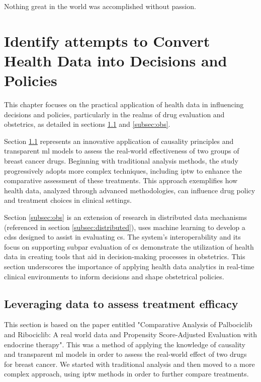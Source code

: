 \begin{savequote}[85mm]
    Nothing great in the world was accomplished 
    without passion.
    \end{savequote}
    
\chapter{Identify attempts to Convert Health Data into Decisions and Policies}\label{chap:goal3}
This chapter focuses on the practical application of health data in influencing decisions and policies, particularly in the realms of drug evaluation and obstetrics, as detailed in sections \ref{subsec:ipop} and \ref{subsec:obs}.

Section \ref{subsec:ipop} represents an innovative application of causality principles and transparent \ac{ml} models to assess the real-world effectiveness of two groups of breast cancer drugs. Beginning with traditional analysis methods, the study progressively adopts more complex techniques, including \ac{iptw} to enhance the comparative assessment of these treatments. This approach exemplifies how health data, analyzed through advanced methodologies, can influence drug policy and treatment choices in clinical settings.

Section \ref{subsec:obs} is an extension of research in distributed data mechanisms (referenced in section \ref{subsec:distributed}), uses machine learning to develop a \ac{cdss} designed to assist in evaluating \ac{cs}. The system's interoperability and its focus on supporting subpar evaluation of \ac{cs} demonstrate the utilization of health data in creating tools that aid in decision-making processes in obstetrics. This section underscores the importance of applying health data analytics in real-time clinical environments to inform decisions and shape obstetrical policies.



\section{Leveraging data to assess treatment efficacy}\label{subsec:ipop}
This section is based on the paper entitled "Comparative Analysis of Palbociclib and Ribociclib: A real world data and Propensity Score-Adjusted Evaluation with endocrine therapy". This was a method of applying the knowledge of causality and transparent \ac{ml} models in order to assess the real-world effect of two drugs for breast cancer. We started with traditional analysis and then moved to a more complex approach, using \ac{iptw} methods in order to further compare treatments.
    
